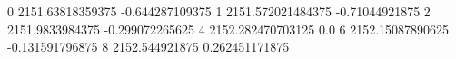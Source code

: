 0 2151.63818359375 -0.644287109375
1 2151.572021484375 -0.71044921875
2 2151.9833984375 -0.299072265625
4 2152.282470703125 0.0
6 2152.15087890625 -0.131591796875
8 2152.544921875 0.262451171875
